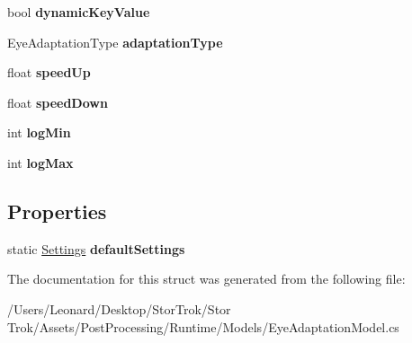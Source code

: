 \begin{DoxyCompactItemize}
bool {\bfseries dynamic\+Key\+Value}
\item 
\mbox{\label{struct_unity_engine_1_1_post_processing_1_1_eye_adaptation_model_1_1_settings_a9dc6f8242b612ecfeaf1bb854e49a9f3}} 
Eye\+Adaptation\+Type {\bfseries adaptation\+Type}
\item 
\mbox{\label{struct_unity_engine_1_1_post_processing_1_1_eye_adaptation_model_1_1_settings_a16ecb91ebe339a0b0775a67a4eb04c61}} 
float {\bfseries speed\+Up}
\item 
\mbox{\label{struct_unity_engine_1_1_post_processing_1_1_eye_adaptation_model_1_1_settings_acf5028b7150072c3b3907e9b7cf0a878}} 
float {\bfseries speed\+Down}
\item 
\mbox{\label{struct_unity_engine_1_1_post_processing_1_1_eye_adaptation_model_1_1_settings_a9320d074e46d0714a75171f40e1c554d}} 
int {\bfseries log\+Min}
\item 
\mbox{\label{struct_unity_engine_1_1_post_processing_1_1_eye_adaptation_model_1_1_settings_ab1e84b7f5403c844e026677ce5e1c6ea}} 
int {\bfseries log\+Max}
\end{DoxyCompactItemize}
\subsection*{Properties}
\begin{DoxyCompactItemize}
\item 
\mbox{\label{struct_unity_engine_1_1_post_processing_1_1_eye_adaptation_model_1_1_settings_af84171d648e86938b92e10bf39a35ad1}} 
static \hyperlink{struct_unity_engine_1_1_post_processing_1_1_eye_adaptation_model_1_1_settings}{Settings} {\bfseries default\+Settings}
\end{DoxyCompactItemize}


The documentation for this struct was generated from the following file\+:\begin{DoxyCompactItemize}
\item 
/\+Users/\+Leonard/\+Desktop/\+Stor\+Trok/\+Stor Trok/\+Assets/\+Post\+Processing/\+Runtime/\+Models/Eye\+Adaptation\+Model.\+cs\end{DoxyCompactItemize}
